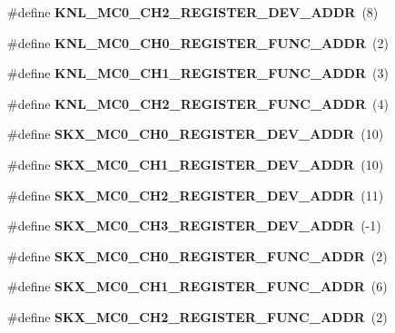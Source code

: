 \begin{DoxyCompactItemize}
\item 
\mbox{\label{types_8h_a38de6a71438fabfe5bd7a6dcf80e0537}} 
\#define {\bfseries K\+N\+L\+\_\+\+M\+C0\+\_\+\+C\+H2\+\_\+\+R\+E\+G\+I\+S\+T\+E\+R\+\_\+\+D\+E\+V\+\_\+\+A\+D\+DR}~(8)
\item 
\mbox{\label{types_8h_ad87618cbc6d50da6447cc012521a2982}} 
\#define {\bfseries K\+N\+L\+\_\+\+M\+C0\+\_\+\+C\+H0\+\_\+\+R\+E\+G\+I\+S\+T\+E\+R\+\_\+\+F\+U\+N\+C\+\_\+\+A\+D\+DR}~(2)
\item 
\mbox{\label{types_8h_ae14117b44caf88be1646daac4604c298}} 
\#define {\bfseries K\+N\+L\+\_\+\+M\+C0\+\_\+\+C\+H1\+\_\+\+R\+E\+G\+I\+S\+T\+E\+R\+\_\+\+F\+U\+N\+C\+\_\+\+A\+D\+DR}~(3)
\item 
\mbox{\label{types_8h_ac787ee64050c24a0ae2402c7394e56f8}} 
\#define {\bfseries K\+N\+L\+\_\+\+M\+C0\+\_\+\+C\+H2\+\_\+\+R\+E\+G\+I\+S\+T\+E\+R\+\_\+\+F\+U\+N\+C\+\_\+\+A\+D\+DR}~(4)
\item 
\mbox{\label{types_8h_a0ae6dbaa6f3e48e36dc4f954a7b2133c}} 
\#define {\bfseries S\+K\+X\+\_\+\+M\+C0\+\_\+\+C\+H0\+\_\+\+R\+E\+G\+I\+S\+T\+E\+R\+\_\+\+D\+E\+V\+\_\+\+A\+D\+DR}~(10)
\item 
\mbox{\label{types_8h_ac3dbfb4a20a3e5877facb7fd05aa7f18}} 
\#define {\bfseries S\+K\+X\+\_\+\+M\+C0\+\_\+\+C\+H1\+\_\+\+R\+E\+G\+I\+S\+T\+E\+R\+\_\+\+D\+E\+V\+\_\+\+A\+D\+DR}~(10)
\item 
\mbox{\label{types_8h_a206790b4d9d14f05fe182a7eb1fc80a4}} 
\#define {\bfseries S\+K\+X\+\_\+\+M\+C0\+\_\+\+C\+H2\+\_\+\+R\+E\+G\+I\+S\+T\+E\+R\+\_\+\+D\+E\+V\+\_\+\+A\+D\+DR}~(11)
\item 
\mbox{\label{types_8h_a24e74985391b61f799d549600e3f7ed9}} 
\#define {\bfseries S\+K\+X\+\_\+\+M\+C0\+\_\+\+C\+H3\+\_\+\+R\+E\+G\+I\+S\+T\+E\+R\+\_\+\+D\+E\+V\+\_\+\+A\+D\+DR}~(-\/1)
\item 
\mbox{\label{types_8h_a917dc42c3a5ef74c9f75992e0b9ba772}} 
\#define {\bfseries S\+K\+X\+\_\+\+M\+C0\+\_\+\+C\+H0\+\_\+\+R\+E\+G\+I\+S\+T\+E\+R\+\_\+\+F\+U\+N\+C\+\_\+\+A\+D\+DR}~(2)
\item 
\mbox{\label{types_8h_afb6c3993fad38d3dd507d155cb6952a1}} 
\#define {\bfseries S\+K\+X\+\_\+\+M\+C0\+\_\+\+C\+H1\+\_\+\+R\+E\+G\+I\+S\+T\+E\+R\+\_\+\+F\+U\+N\+C\+\_\+\+A\+D\+DR}~(6)
\item 
\mbox{\label{types_8h_a47061bfe651ae31a37fa27684f24aa1a}} 
\#define {\bfseries S\+K\+X\+\_\+\+M\+C0\+\_\+\+C\+H2\+\_\+\+R\+E\+G\+I\+S\+T\+E\+R\+\_\+\+F\+U\+N\+C\+\_\+\+A\+D\+DR}~(2)
\item 
\mbox{\label{types_8h_af6574c3cb841385974e08e1f076cb90c}} 

\end{DoxyCompactItemize}
